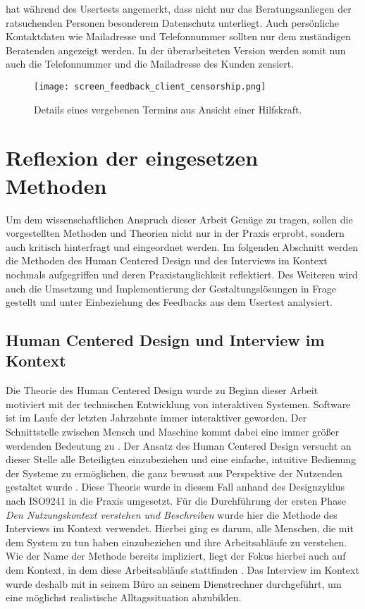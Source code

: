 \ipName hat während des Usertests angemerkt, dass nicht nur das Beratungsanliegen der ratsuchenden Personen besonderem Datenschutz unterliegt. Auch persönliche Kontaktdaten wie Mailadresse und Telefonnummer sollten nur dem zuständigen Beratenden angezeigt werden. In der überarbeiteten Version werden somit nun auch die Telefonnummer und die Mailadresse des Kunden zensiert.

\begin{figure}[H]
    \caption{Details eines vergebenen Termins aus Ansicht einer Hilfskraft.}
    \centering
    \texttt{[image: screen\_feedback\_client\_censorship.png]}
\end{figure}

\section{Reflexion der eingesetzen Methoden}
\label{subsection:reflection}

Um dem wissenschaftlichen Anspruch dieser Arbeit Genüge zu tragen, sollen die
vorgestellten Methoden und Theorien nicht nur in der Praxis erprobt, sondern
auch kritisch hinterfragt und eingeordnet werden. Im folgenden Abschnitt werden
die Methoden des Human Centered Design und des Interviews im Kontext nochmals
aufgegriffen und deren Praxistauglichkeit reflektiert. Des Weiteren wird auch
die Umsetzung und Implementierung der Gestaltungslösungen in Frage gestellt und
unter Einbeziehung des Feedbacks aus dem Usertest analysiert.

\subsection*{Human Centered Design und Interview im Kontext}
Die Theorie des Human Centered Design wurde zu Beginn dieser Arbeit motiviert
mit der technischen Entwicklung von interaktiven Systemen. Software ist im
Laufe der letzten Jahrzehnte immer interaktiver geworden. Der Schnittstelle
zwischen Mensch und Maschine kommt dabei eine immer größer werdenden Bedeutung
zu \cite{hci}. Der Ansatz des Human Centered Design versucht an dieser Stelle
alle Beteiligten einzubeziehen und eine einfache, intuitive Bedienung der
Systeme zu ermöglichen, die ganz bewusst aus Perspektive der Nutzenden
gestaltet wurde \cite{sequenceDiagrams}. Diese Theorie wurde in diesem Fall
anhand des Designzyklus nach ISO9241 in die Praxis umgesetzt. Für die
Durchführung der ersten Phase \textit{Den Nutzungskontext verstehen und
    Beschreiben} wurde hier die Methode des Interviews im Kontext verwendet.
Hierbei ging es darum, alle Menschen, die mit dem System zu tun haben
einzubeziehen und ihre Arbeitsabläufe zu verstehen. Wie der Name der Methode
bereits impliziert, liegt der Fokus hierbei auch auf dem Kontext, in dem diese
Arbeitsabläufe stattfinden \cite{hciHandbook}. Das Interview im Kontext wurde
deshalb mit \ipName in seinem Büro an seinem Dienstrechner durchgeführt, um eine
möglichst realistische Alltagssituation abzubilden.

